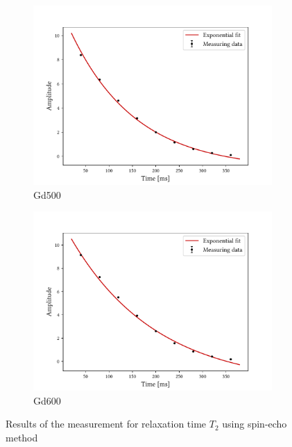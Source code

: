 \begin{figure}[ht]
\begin{subfigure}{.45\textwidth}
\includegraphics[width=9.3cm]{..//figures//f61_abb_2.pdf}
\caption{Gd500}
\end{subfigure}
\qquad
\begin{subfigure}{.45\textwidth}
\includegraphics[width=9.3cm]{..//figures//f61_abb_2_600.pdf}
\caption{Gd600}
\end{subfigure}
\caption{Results of the measurement for relaxation time $T_2$ using spin-echo method}
\label{fig:t2se}
\end{figure}

